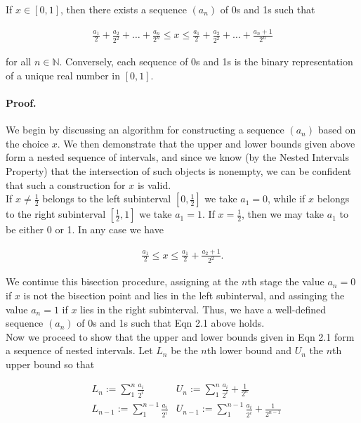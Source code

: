 \documentclass[paper=a4, fontsize=11pt]{scrartcl} %
\numberwithin{equation}{section} %
\numberwithin{figure}{section} %
\numberwithin{table}{section} %
\begin{document}
If $x \in [0,1]$, then there exists a sequence $(a_n)$ of 0s and 1s such that

\begin{align} 
\frac{a_1}{2} + \frac{a_2}{2^2} + \dots + \frac{a_n}{2^n} \leq x \leq \frac{a_1}{2} + \frac{a_2}{2^2} + \dots + \frac{a_n + 1}{2^n}
\end{align}

for all $n \in \mathbb{N}$. Conversely, each sequence of 0s and 1s is the binary representation of a unique real number in $[0,1]$.\\

\paragraph{Proof.} We begin by discussing an algorithm for constructing a sequence $(a_n)$ based on the choice $x$. We then demonstrate that the upper and lower bounds given above form a nested sequence of intervals, and since we know (by the Nested Intervals Property) that the intersection of such objects is nonempty, we can be confident that such a construction for $x$ is valid.\\

If $x \neq \frac{1}{2}$ belongs to the left subinterval $[0,\frac{1}{2}]$ we take $a_1 = 0$, while if $x$ belongs to the right subinterval $[\frac{1}{2},1]$ we take $a_1 = 1$. If $x = \frac{1}{2}$, then we may take $a_1$ to be either 0 or 1. In any case we have

\begin{align}
\frac{a_1}{2} \leq x \leq \frac{a_1}{2} + \frac{a_2 + 1}{2^2}.
\end{align}

We continue this bisection procedure, assigning at the $n$th stage the value $a_n = 0$ if $x$ is not the bisection point and lies in the left subinterval, and assinging the value $a_n = 1$ if $x$ lies in the right subinterval. Thus, we have a well-defined sequence $(a_n)$ of 0s and 1s such that Eqn 2.1 above holds.\\

Now we proceed to show that the upper and lower bounds given in Eqn 2.1 form a sequence of nested intervals. Let $L_n$ be the $n$th lower bound and $U_n$ the $n$th upper bound so that

\begin{align*}
&L_n := \sum_{1}^{n} \frac{a_i}{2^i}       &U_n := \sum_{1}^{n} \frac{a_i}{2^i} + \frac{1}{2^n}\\
&L_{n-1} := \sum_{1}^{n-1} \frac{a_i}{2^i} &U_{n-1} := \sum_{1}^{n-1} \frac{a_i}{2^i} + \frac{1}{2^{n-1}}
\end{align*}
\end{document}
